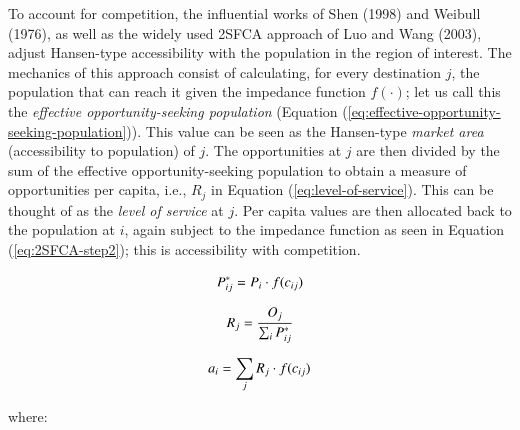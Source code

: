 \documentclass[]{elsarticle} %
\begin{document}
To account for competition, the influential works of Shen (1998) and
Weibull (1976), as well as the widely used 2SFCA approach of Luo and
Wang (2003), adjust Hansen-type accessibility with the population in the
region of interest. The mechanics of this approach consist of
calculating, for every destination \(j\), the population that can reach
it given the impedance function \(f(\cdot)\); let us call this the
\emph{effective opportunity-seeking population} (Equation
(\ref{eq:effective-opportunity-seeking-population})). This value can be
seen as the Hansen-type \emph{market area} (accessibility to population)
of \(j\). The opportunities at \(j\) are then divided by the sum of the
effective opportunity-seeking population to obtain a measure of
opportunities per capita, i.e., \(R_j\) in Equation
(\ref{eq:level-of-service}). This can be thought of as the \emph{level
of service} at \(j\). Per capita values are then allocated back to the
population at \(i\), again subject to the impedance function as seen in
Equation (\ref{eq:2SFCA-step2}); this is accessibility with competition.

\begin{equation}
\label{eq:effective-opportunity-seeking-population}
P_{ij}^* = P_{i} \cdot f(c_{ij})\\
\end{equation}

\begin{equation}
\label{eq:level-of-service}
R_{j} = \frac{O_{j}}{\sum_i P_{ij}^*}\\
\end{equation}

\begin{equation}
\label{eq:2SFCA-step2}
a_{i} = {\sum_j R_{j} \cdot f(c_{ij})}\\
\end{equation}

\noindent where:
\end{document}
